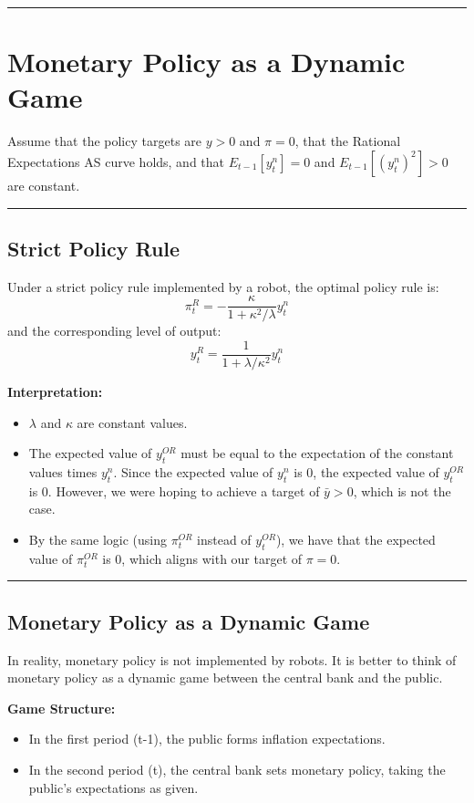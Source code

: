 \documentclass{article}
\begin{document}
\noindent\rule{\linewidth}{1pt}

\section{Monetary Policy as a Dynamic Game}

Assume that the policy targets are \( y > 0 \) and \( \pi = 0 \), that the Rational Expectations AS curve holds, and that \( E_{t-1} [y^n_t] = 0 \) and \( E_{t-1} [(y^n_t)^2] > 0 \) are constant.

\noindent\rule{\linewidth}{0.5pt}

\subsection{Strict Policy Rule}

Under a strict policy rule implemented by a robot, the optimal policy rule is:
\[ \pi^R_t = -\frac{\kappa}{1 + \kappa^2 / \lambda} y^n_t \]
and the corresponding level of output:
\[ y^R_t = \frac{1}{1 + \lambda / \kappa^2} y^n_t \]

\textbf{Interpretation:}
\begin{itemize}
    \item \(\lambda\) and \(\kappa\) are constant values.
    \item The expected value of \( y_t^{OR} \) must be equal to the expectation of the constant values times \( y_t^n \). Since the expected value of \( y_t^n \) is 0, the expected value of \( y_t^{OR} \) is 0. However, we were hoping to achieve a target of \( \bar{y} > 0 \), which is not the case.
    \item By the same logic (using \(\pi_t^{OR}\) instead of \(y_t^{OR}\)), we have that the expected value of \(\pi_t^{OR}\) is 0, which aligns with our target of \(\pi = 0\).
\end{itemize}

\noindent\rule{\linewidth}{0.5pt}

\subsection{Monetary Policy as a Dynamic Game}

In reality, monetary policy is not implemented by robots. It is better to think of monetary policy as a dynamic game between the central bank and the public.

\textbf{Game Structure:}
\begin{itemize}
    \item In the first period (t-1), the public forms inflation expectations.
    \item In the second period (t), the central bank sets monetary policy, taking the public's expectations as given.
\end{itemize}
\end{document}

